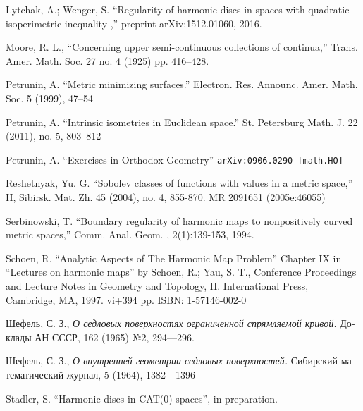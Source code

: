 \documentclass{article}
\begin{document}
\begin{thebibliography}{52}
Lytchak, A.; Wenger, S. ``Regularity of harmonic discs in spaces with quadratic isoperimetric inequality  ,'' preprint  arXiv:1512.01060, 2016.

Moore, R. L.,
``Concerning upper semi-continuous collections of continua,''
Trans. Amer. Math. Soc. 27 no. 4 (1925) pp. 416--428.

 Petrunin, A.
``Metric minimizing surfaces.''
Electron. Res. Announc. Amer. Math. Soc. 5 (1999), 47--54 

 Petrunin, A.
``Intrinsic isometries in Euclidean space.''
St. Petersburg Math. J. 22 (2011), no. 5, 803--812 

 Petrunin, A. 
``Exercises in Orthodox Geometry''
{\tt arXiv:0906.0290 [math.HO]}

Reshetnyak, Yu. G. ``Sobolev classes of functions with values in a metric space,'' II, Sibirsk. Mat. Zh. 45 (2004), no. 4, 855-870. MR 2091651 (2005e:46055)

 Serbinowski,  T. ``Boundary regularity of harmonic maps to nonpositively curved metric spaces,''
Comm. Anal. Geom. , 2(1):139-153, 1994.

Schoen, R. ``Analytic Aspects of The Harmonic Map Problem'' Chapter IX in  
``Lectures on harmonic maps'' by Schoen, R.; Yau, S. T.,  
Conference Proceedings and Lecture Notes in Geometry and Topology, II. International Press, Cambridge, MA, 1997. vi+394 pp. ISBN: 1-57146-002-0

\begin{otherlanguage}{russian}
Шефель, С. З.,
\textit{О седловых поверхностях ограниченной спрямляемой кривой.}
Доклады АН СССР, 162 (1965) №2, 
294---296.
\end{otherlanguage}

\begin{otherlanguage}{russian}
Шефель, С. З., 
\textit{О внутренней геометрии седловых поверхностей.}
Сибирский математический журнал, 5 (1964), 1382---1396
\end{otherlanguage}

 Stadler, S. ``Harmonic discs in CAT(0) spaces'', in preparation.



\end{thebibliography}
\end{document}
